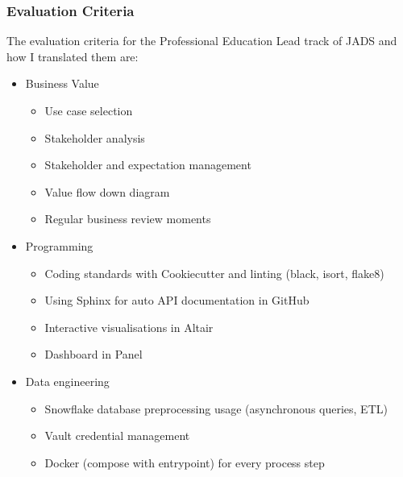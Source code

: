 \documentclass[letterpaper,10pt,english]{sphinxmanual}
\begin{document}
\subsubsection{Evaluation Criteria}
\label{\detokenize{deployment:evaluation-criteria}}
The evaluation criteria for the Professional Education Lead track of JADS and how I translated them are:
\begin{itemize}
\item {} 
Business Value
\begin{itemize}
\item {} 
Use case selection

\item {} 
Stakeholder analysis

\item {} 
Stakeholder and expectation management

\item {} 
Value flow down diagram

\item {} 
Regular business review moments

\end{itemize}

\item {} 
Programming
\begin{itemize}
\item {} 
Coding standards with Cookiecutter and linting (black, isort, flake8)

\item {} 
Using Sphinx for auto API documentation in GitHub

\item {} 
Interactive visualisations in Altair

\item {} 
Dashboard in Panel

\end{itemize}

\item {} 
Data engineering
\begin{itemize}
\item {} 
Snowflake database preprocessing usage (asynchronous queries, ETL)

\item {} 
Vault credential management

\item {} 
Docker (compose with entrypoint) for every process step

\end{itemize}


\end{itemize}
\end{document}
